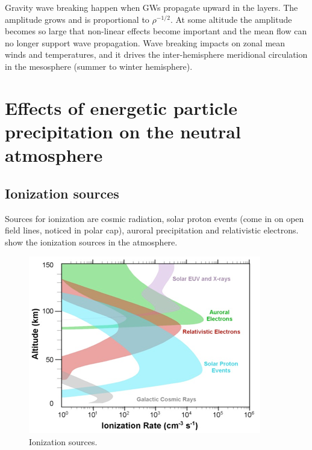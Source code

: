 Gravity wave breaking happen when GWs propagate upward in the layers. The amplitude grows and is proportional to \(\rho^{-1/2}\). At some altitude the amplitude becomes so large that non-linear effects become important and the mean flow can no longer support wave propagation. Wave breaking impacts on zonal mean winds and temperatures, and it drives the inter-hemisphere meridional circulation in the mesosphere (summer to winter hemisphere).

\section[Energetic particle precipitation \& the neutral atmosphere]{Effects of energetic particle precipitation on the neutral atmosphere \citep{NesseTyssoy2010Cium}}
\subsection{Ionization sources}
Sources for ionization are cosmic radiation, solar proton events (come in on open field lines, noticed in polar cap), auroral precipitation and relativistic electrons.  show the ionization sources in the atmosphere.
\begin{figure}[t]
    \centering
    \includegraphics[width=.6\linewidth]{bilder/L6_ionization_sources.png}
    \caption{Ionization sources.}\label{fig:L6_ionization_sources}
\end{figure}

